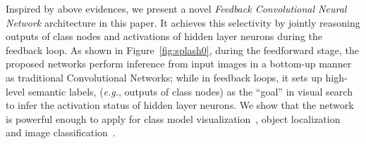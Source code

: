 Inspired by above evidences, we present a novel \emph{Feedback Convolutional Neural Network} architecture in this paper. It achieves this selectivity by jointly reasoning outputs of class nodes and activations of hidden layer neurons during the feedback loop. As shown in Figure~\ref{fig:splash0}, during the feedforward stage, the proposed networks perform inference from input images in a bottom-up manner as traditional Convolutional Networks; while in feedback loops, it sets up high-level semantic labels, (\emph{e.g.}, outputs of class nodes) as the ``goal'' in visual search to infer the activation status of hidden layer neurons. We show that the network is powerful enough to apply for class model visualization~\cite{simonyan2013deep, zeiler2014visualizing}, object localization~\cite{simonyan2013deep} and image classification~\cite{Krizhevsky2012ImageNet}.

